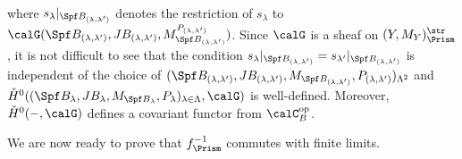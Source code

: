 \begin{defn}
\begin{align*}
\end{align*}
where $s_\lambda|_{\Spf B_{(\lambda,\lambda')}}$ denotes the restriction of $s_\lambda$ to $\calG(\Spf B_{(\lambda,\lambda')}, JB_{(\lambda,\lambda')}, M_{\Spf B_{(\lambda,\lambda')}}^{P_{(\lambda,\lambda')}})$. Since $\calG$ is a sheaf on $(Y,M_Y)_\Prism^{\str}$, it is not difficult to see that the condition $s_\lambda|_{\Spf B_{(\lambda,\lambda')}}=s_{\lambda'}|_{\Spf B_{(\lambda,\lambda')}}$ is independent of the choice of $(\Spf B_{(\lambda,\lambda')}, JB_{(\lambda,\lambda')}, M_{\Spf B_{(\lambda,\lambda')}}, P_{(\lambda,\lambda')})_{\Lambda^2}$ and $\check{H}^0((\Spf B_\lambda, JB_\lambda, M_{\Spf B_\lambda}, P_\lambda)_{\lambda\in \Lambda},\calG)$ is well-defined. Moreover, $\check{H}^0(-,\calG)$ defines a covariant functor from $\calC_B^{\mathrm{op}}$.
\end{defn}

We are now ready to prove that $f_\Prism^{-1}$ commutes with finite limits.


